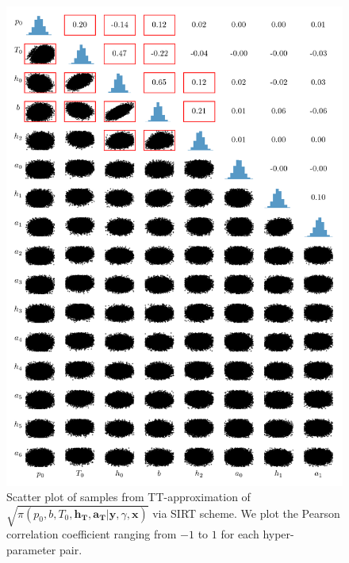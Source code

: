 \begin{figure}[h]%
	\includegraphics[]{CorrPlot.png}
	\caption[Correlation plot of samples from TT-approximation]{Scatter plot of samples from TT-approximation of $\sqrt{\pi(p_0,b,T_0,\bm{h_T},\bm{a_T} | \bm{y}, \gamma, \bm{x})}$ via SIRT scheme. We plot the Pearson correlation coefficient ranging from $-1$ to $1$ for each hyper-parameter pair.}
	\label{fig:CorrPlot}
\end{figure}
